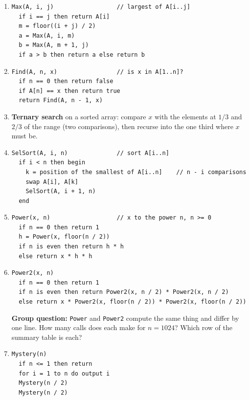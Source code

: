 \documentclass{fkt-notes}
\begin{document}
\begin{enumerate}[label=\textbf{1.\arabic*},leftmargin=2.5em]
\item \begin{lstlisting}
Max(A, i, j)                  // largest of A[i..j]
  if i == j then return A[i]
  m = floor((i + j) / 2)
  a = Max(A, i, m)
  b = Max(A, m + 1, j)
  if a > b then return a else return b
\end{lstlisting}

\item \begin{lstlisting}
Find(A, n, x)                 // is x in A[1..n]?
  if n == 0 then return false
  if A[n] == x then return true
  return Find(A, n - 1, x)
\end{lstlisting}

\item \textbf{Ternary search} on a sorted array: compare $x$ with the elements at $1/3$ and $2/3$ of the range (two comparisons), then recurse into the one third where $x$ must be.

\item \begin{lstlisting}
SelSort(A, i, n)              // sort A[i..n]
  if i < n then begin
    k = position of the smallest of A[i..n]    // n - i comparisons
    swap A[i], A[k]
    SelSort(A, i + 1, n)
  end
\end{lstlisting}

\item \begin{lstlisting}
Power(x, n)                   // x to the power n, n >= 0
  if n == 0 then return 1
  h = Power(x, floor(n / 2))
  if n is even then return h * h
  else return x * h * h
\end{lstlisting}

\item \begin{lstlisting}
Power2(x, n)
  if n == 0 then return 1
  if n is even then return Power2(x, n / 2) * Power2(x, n / 2)
  else return x * Power2(x, floor(n / 2)) * Power2(x, floor(n / 2))
\end{lstlisting}
\textbf{Group question:} \texttt{Power} and \texttt{Power2} compute the same thing and differ by one line. How many calls does each make for $n=1024$? Which row of the summary table is each?

\item \begin{lstlisting}
Mystery(n)
  if n <= 1 then return
  for i = 1 to n do output i
  Mystery(n / 2)
  Mystery(n / 2)
\end{lstlisting}


\end{enumerate}
\end{document}
